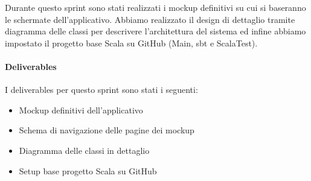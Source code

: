 Durante questo sprint sono stati realizzati i mockup definitivi su cui si baseranno le schermate dell'applicativo. 
Abbiamo realizzato il design di dettaglio tramite diagramma delle classi per descrivere l'architettura del sistema ed infine abbiamo impostato il progetto base Scala su GitHub (Main, sbt e ScalaTest). 

\paragraph{Deliverables} 
I deliverables per questo sprint sono stati i seguenti:
\begin{itemize}
    \item Mockup definitivi dell'applicativo
    \item Schema di navigazione delle pagine dei mockup
    \item Diagramma delle classi in dettaglio
    \item Setup base progetto Scala su GitHub
\end{itemize}